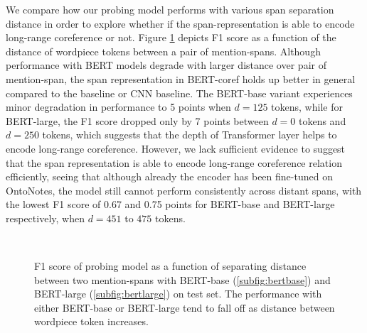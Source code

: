 \documentclass[11pt]{article}
\begin{document}
We compare how our probing model performs with various span separation distance in order to explore whether if the span-representation is able to encode long-range coreference or not. Figure \ref{fig:longrange_result} depicts F1 score as a function of the distance of wordpiece tokens between a pair of mention-spans. Although performance with BERT models degrade with larger distance over pair of mention-span, the span representation in BERT-coref holds up better in general compared to the baseline or CNN baseline. The BERT-base variant experiences minor degradation in performance to 5 points when $d=125$ tokens, while for BERT-large, the F1 score dropped only by 7 points between $d=0$ tokens and $d=250$ tokens, which suggests that the depth of Transformer layer helps to encode long-range coreference. However, we lack sufficient evidence to suggest that the span representation is able to encode long-range coreference relation efficiently, seeing that although already the encoder has been fine-tuned on OntoNotes, the model still cannot perform consistently across distant spans, with the lowest F1 score of 0.67 and 0.75 points for BERT-base and BERT-large respectively, when $d=451$ to $475$ tokens.
\begin{figure}[ht]
 \\
  \caption{F1 score of probing model as a function of separating distance between two mention-spans with BERT-base (\ref{subfig:bertbase}) and BERT-large (\ref{subfig:bertlarge}) on test set. The performance with either BERT-base or BERT-large tend to fall off as distance between wordpiece token increases.}
  \label{fig:longrange_result} 
\end{figure}
\end{document}

